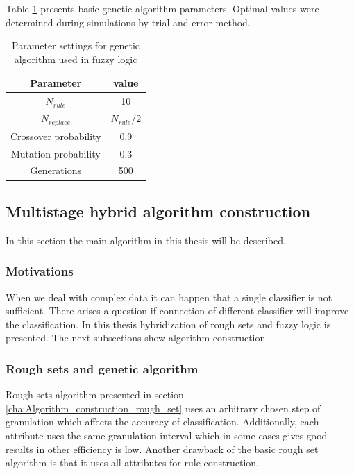 Table \ref{tab:fuzzy_genetic_parameters} presents basic genetic algorithm parameters.
Optimal values were determined during simulations by trial and error method.
\begin{table}[H]
    \caption{Parameter settings for genetic algorithm used in fuzzy logic}
    \centering
    \begin{tabular}{|c|c|}
        \hline
        Parameter & value \\ \hline \hline
        $N_{rule}$ & 10 \\ \hline
        $N_{replace}$ & $N_{rule}/2$ \\ \hline
        Crossover probability & 0.9 \\ \hline
        Mutation probability & 0.3 \\ \hline
        Generations & 500 \\ \hline
    \end{tabular}
    \label{tab:fuzzy_genetic_parameters}
\end{table}
\subsection{Multistage hybrid algorithm construction}
\label{cha:Multistage}
In this section the main algorithm in this thesis will be described. 
\subsubsection{Motivations}
\label{cha:Mutlistage_motivations}
When we deal with complex data it can happen that a single classifier is not
sufficient. There arises a question if connection of different classifier will
improve the classification. In this thesis hybridization of rough sets and
fuzzy logic is presented. The next subsections show algorithm construction.
\subsubsection{Rough sets and genetic algorithm}
\label{cha:Multistage_rough_genetic}
Rough sets algorithm presented in section
\ref{cha:Algorithm_construction_rough_set} uses an arbitrary chosen step of
granulation which affects the accuracy of classification. Additionally, each
attribute uses the same granulation interval which in some cases gives good
results in other efficiency is low. Another drawback of the basic rough set
algorithm is that it uses all attributes for rule construction. 

